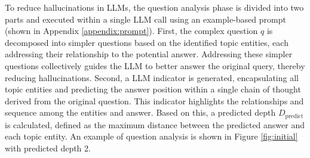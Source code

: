 


To reduce hallucinations in LLMs, the question analysis phase is divided into two parts and executed within a single LLM call using an example-based prompt (shown in Appendix \ref{appendix:prompt}).
First, the complex question $q$ is decomposed into simpler questions based on the identified topic entities, each addressing their relationship to the potential answer. Addressing these simpler questions collectively guides the LLM to better answer the original query, thereby reducing hallucinations.
Second, a LLM indicator is generated, encapsulating all topic entities and predicting the answer position within a single chain of thought derived from the original question. This indicator highlights the relationships and sequence among the entities and answer. Based on this, a predicted depth $D_{\text{predict}}$ is calculated, defined as the maximum distance between the predicted answer and each topic entity.
An example of question analysis is shown in Figure \ref{fig:initial} with predicted depth 2.







